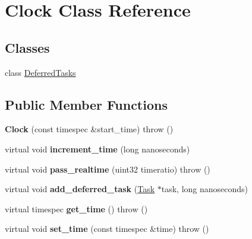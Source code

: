 \hypertarget{classClock}{
\section{Clock Class Reference}
\label{classClock}
}
\subsection*{Classes}
\begin{DoxyCompactItemize}
\item 
class \hyperlink{classClock_1_1DeferredTasks}{DeferredTasks}
\end{DoxyCompactItemize}
\subsection*{Public Member Functions}
\begin{DoxyCompactItemize}
\item 
\hypertarget{classClock_a52d72e9e9e8acd243bd0692b222898e5}{
{\bfseries Clock} (const timespec \&start\_\-time)  throw ()}
\label{classClock_a52d72e9e9e8acd243bd0692b222898e5}

\item 
\hypertarget{classClock_a4007cf9c21326281382a1f1244616e9d}{
virtual void {\bfseries increment\_\-time} (long nanoseconds)}
\label{classClock_a4007cf9c21326281382a1f1244616e9d}

\item 
\hypertarget{classClock_a1e102973afde24e2b1fc4f897976ce86}{
virtual void {\bfseries pass\_\-realtime} (uint32 timeratio)  throw ()}
\label{classClock_a1e102973afde24e2b1fc4f897976ce86}

\item 
\hypertarget{classClock_a78c89e7b78e718b21f4374eb84559d6f}{
virtual void {\bfseries add\_\-deferred\_\-task} (\hyperlink{classTask}{Task} $\ast$task, long nanoseconds)}
\label{classClock_a78c89e7b78e718b21f4374eb84559d6f}

\item 
\hypertarget{classClock_a97be7b0e631ff16e23d257bdbfd46bca}{
virtual timespec {\bfseries get\_\-time} ()  throw ()}
\label{classClock_a97be7b0e631ff16e23d257bdbfd46bca}

\item 
\hypertarget{classClock_a0c2cf0c2c990fe3e243d2ff1da458fa1}{
virtual void {\bfseries set\_\-time} (const timespec \&time)  throw ()}
\label{classClock_a0c2cf0c2c990fe3e243d2ff1da458fa1}

\end{DoxyCompactItemize}
